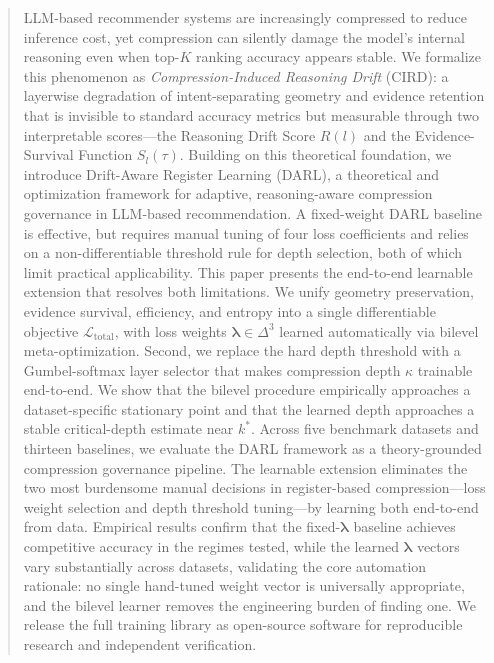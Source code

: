 \documentclass[lettersize,journal]{IEEEtran}
\newcommand{\calL}{\mathcal{L}}
\newcommand{\lambdavec}{\boldsymbol{\lambda}}
\begin{document}
\begin{abstract}
LLM-based recommender systems are increasingly compressed to reduce
inference cost, yet compression can silently damage the model's
internal reasoning even when top-$K$ ranking accuracy appears stable.
We formalize this phenomenon as \emph{Compression-Induced Reasoning Drift}
(CIRD): a layerwise degradation of intent-separating geometry and
evidence retention that is invisible to standard accuracy metrics
but measurable through two interpretable scores---the
Reasoning Drift Score $R(l)$ and the Evidence-Survival
Function $S_l(\tau)$.
Building on this theoretical foundation, we introduce
Drift-Aware Register Learning (DARL), a theoretical and
optimization framework for adaptive, reasoning-aware
compression governance in LLM-based recommendation.
A fixed-weight DARL baseline is effective, but requires manual
tuning of four loss coefficients and relies on a non-differentiable
threshold rule for depth selection, both of which limit
practical applicability.
This paper presents the end-to-end learnable extension that
resolves both limitations.
We unify geometry preservation, evidence survival,
efficiency, and entropy into a single differentiable objective
$\calL_{\text{total}}$, with loss weights $\lambdavec \in \Delta^3$
learned automatically via bilevel meta-optimization.
Second, we replace the hard depth threshold with a
Gumbel-softmax layer selector that makes compression depth
$\kappa$ trainable end-to-end.
We show that the bilevel procedure empirically approaches a
dataset-specific stationary point and that the learned depth
approaches a stable critical-depth estimate near $k^*$.
Across five benchmark datasets and thirteen baselines, we evaluate
the DARL framework as a theory-grounded compression governance pipeline.
The learnable extension eliminates the two most burdensome manual
decisions in register-based compression---loss weight selection and
depth threshold tuning---by learning both end-to-end from data.
Empirical results confirm that the fixed-$\lambdavec$ baseline achieves
competitive accuracy in the regimes tested, while the learned
$\lambdavec$ vectors vary substantially across datasets, validating the
core automation rationale: no single hand-tuned weight vector is
universally appropriate, and the bilevel learner removes the engineering
burden of finding one.
We release the full training library as open-source software for
reproducible research and independent verification.
\end{abstract}
\end{document}
